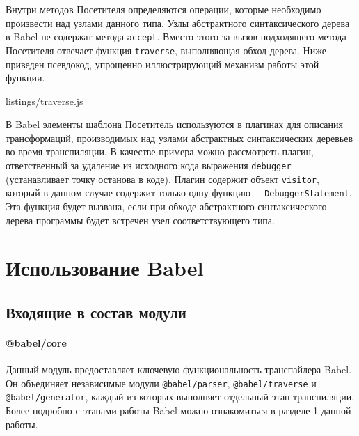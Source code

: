 \documentclass[14pt, a4paper]{article}
\def\code#1{\texttt{#1}} %
\begin{document}
Внутри методов Посетителя определяются операции, которые необходимо произвести над узлами данного типа.
Узлы абстрактного синтаксического дерева в Babel не содержат метода \code{accept}. Вместо этого за вызов
подходящего метода Посетителя отвечает функция \code{traverse}, выполняющая обход дерева. Ниже приведен
псевдокод, упрощенно иллюстрирующий механизм работы этой функции.


{listings/traverse.js}


В Babel элементы шаблона Посетитель используются в плагинах для описания трансформаций, производимых
над узлами абстрактных синтаксических деревьев во время транспиляции. В качестве примера можно рассмотреть
плагин, ответственный за удаление из исходного кода выражения \code{debugger} (устанавливает точку
останова в коде). Плагин содержит объект \code{visitor}, который в данном случае содержит только одну
функцию $-$ \linebreak \code{DebuggerStatement}. Эта функция будет вызвана, если при обходе абстрактного
синтаксического дерева программы будет встречен узел соответствующего типа.



\pagebreak

\section{Использование Babel}
\subsection{Входящие в состав модули}
\paragraph{@babel/core} \mbox{}

Данный модуль предоставляет ключевую функциональность транспайлера Babel. Он объединяет независимые
модули \code{@babel/parser}, \linebreak \code{@babel/traverse} и \code{@babel/generator}, каждый из которых
выполняет отдельный этап транспиляции. Более подробно с этапами работы Babel можно ознакомиться
в разделе 1 данной работы.
\end{document}
